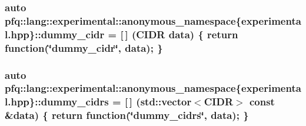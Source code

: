 \subsubsection[{\texorpdfstring{dummy\+\_\+cidr}{dummy_cidr}}]{\setlength{\rightskip}{0pt plus 5cm}auto pfq\+::lang\+::experimental\+::anonymous\+\_\+namespace\{experimental.\+hpp\}\+::dummy\+\_\+cidr = \mbox{[}$\,$\mbox{]} ({\bf C\+I\+DR} data) \{ return {\bf function}(\char`\"{}dummy\+\_\+cidr\char`\"{}, data); \}}\hypertarget{namespacepfq_1_1lang_1_1experimental_1_1anonymous__namespace_02experimental_8hpp_03_a331aab492ad841b1c7a0d95efea00e76}{}\label{namespacepfq_1_1lang_1_1experimental_1_1anonymous__namespace_02experimental_8hpp_03_a331aab492ad841b1c7a0d95efea00e76}
\subsubsection[{\texorpdfstring{dummy\+\_\+cidrs}{dummy_cidrs}}]{\setlength{\rightskip}{0pt plus 5cm}auto pfq\+::lang\+::experimental\+::anonymous\+\_\+namespace\{experimental.\+hpp\}\+::dummy\+\_\+cidrs = \mbox{[}$\,$\mbox{]} (std\+::vector$<${\bf C\+I\+DR}$>$ const \&data) \{ return {\bf function}(\char`\"{}dummy\+\_\+cidrs\char`\"{}, data); \}}\hypertarget{namespacepfq_1_1lang_1_1experimental_1_1anonymous__namespace_02experimental_8hpp_03_ad239e0d3cd310dbf3b86ec109242aca1}{}\label{namespacepfq_1_1lang_1_1experimental_1_1anonymous__namespace_02experimental_8hpp_03_ad239e0d3cd310dbf3b86ec109242aca1}
